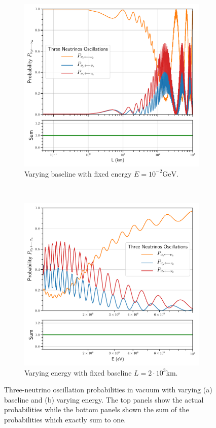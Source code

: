 \documentclass[twocolumn,secnumarabic,amssymb, nobibnotes, aps, prd,10pt]{revtex4-1}
\begin{document}
\begin{figure}
\captionsetup[subfigure]{aboveskip=-1.5pt,belowskip=-1.5pt} 
\begin{subfigure}{1.05\linewidth}
\includegraphics[width=\linewidth]{Osc3VacuumBaseline.pdf}
\caption{Varying baseline with fixed energy $E=10^{-2} \mathrm{GeV}$.} 
\label{higgs:sspt} 
\end{subfigure} 
\\
\begin{subfigure}{1.05\linewidth}
\includegraphics[width=\linewidth]{Osc3VacuumEnergy.pdf}
\caption{Varying energy with fixed baseline $L=2 \cdot 10^3 \mathrm{km}$.} 
\label{fig:vacuum} 
\end{subfigure}
\caption{Three-neutrino oscillation probabilities in vacuum with varying (a) baseline
and (b) varying energy. The top panels show the actual probabilities while the bottom
panels shown the sum of the probabilities which exactly sum to one.}
\end{figure}
\end{document}
